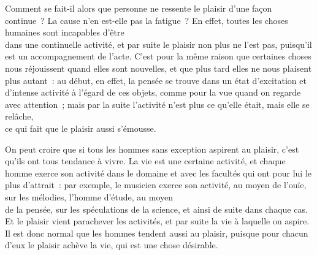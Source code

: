 \documentclass[french,twoside]{book} %
\begin{document}
Comment se fait-il alors que personne ne ressente le plaisir d’une façon continue ? La cause n’en est-elle pas la fatigue ? En effet, toutes les choses humaines sont incapables d’être \\
dans une continuelle activité, et par suite le plaisir non plus ne l’est pas, puisqu’il est un accompagnement de l’acte. C’est pour la même raison que certaines choses nous réjouissent quand elles sont nouvelles, et que plus tard elles ne nous plaisent plus autant : au début, en effet, la pensée se trouve dans un état d’excitation et d’intense activité à l’égard de ces objets, comme pour la vue quand on regarde avec attention ; mais par la suite l’activité n’est plus ce qu’elle était, mais elle se relâche, \\
ce qui fait que le plaisir aussi s’émousse.\par
On peut croire que si tous les hommes sans exception aspirent au plaisir, c’est qu’ils ont tous tendance à vivre. La vie est une certaine activité, et chaque homme exerce son activité dans le domaine et avec les facultés qui ont pour lui le plus d’attrait : par exemple, le musicien exerce son activité, au moyen de l’ouïe, sur les mélodies, l’homme d’étude, au moyen \\
de la pensée, sur les spéculations de la science, et ainsi de suite dans chaque cas. Et le plaisir vient parachever les activités, et par suite la vie à laquelle on aspire. Il est donc normal que les hommes tendent aussi au plaisir, puisque pour chacun d’eux le plaisir achève la vie, qui est une chose désirable.
\end{document}
